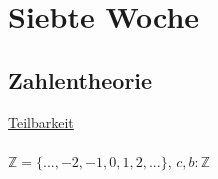 \documentclass[18pt,a4paper]{article}
\begin{document}
\section{Siebte Woche}

\subsection{Zahlentheorie}

\uline{Teilbarkeit}\\
\\
$\mathbb{Z} = \{...,-2,-1,0,1,2,...\}$, $c,b : \mathbb{Z}$\\
\\




 





%
%
\end{document}
